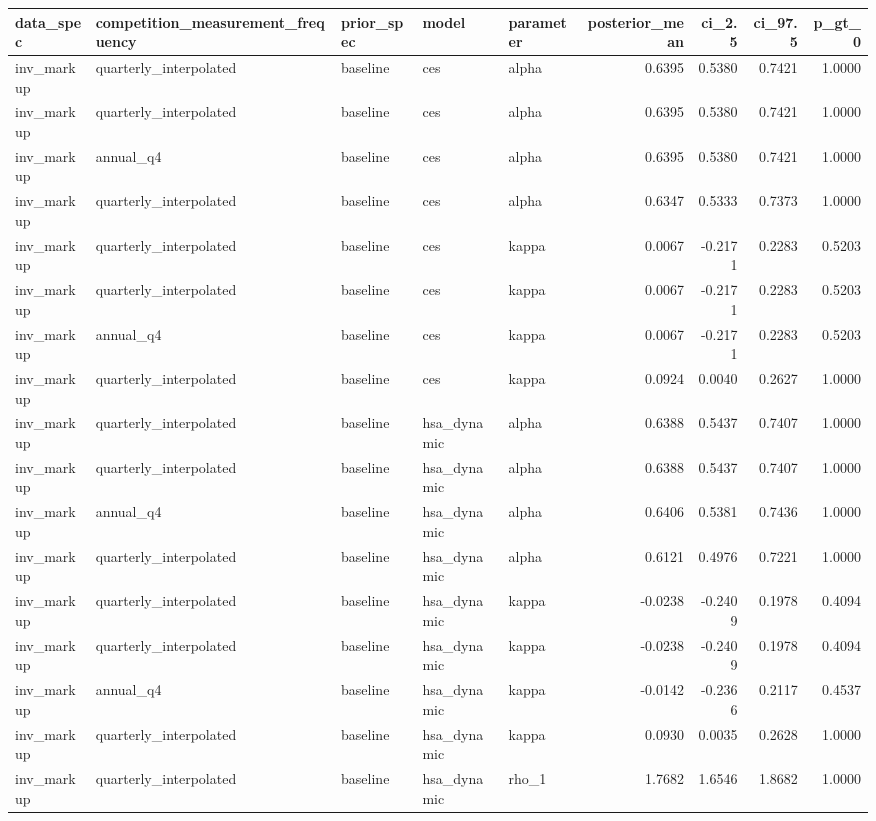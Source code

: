 \begin{tabular}{lllllrrrr}
\toprule
data\_spec & competition\_measurement\_frequency & prior\_spec & model & parameter & posterior\_mean & ci\_2.5 & ci\_97.5 & p\_gt\_0 \\
\midrule
inv\_markup & quarterly\_interpolated & baseline & ces & alpha & 0.6395 & 0.5380 & 0.7421 & 1.0000 \\
inv\_markup & quarterly\_interpolated & baseline & ces & alpha & 0.6395 & 0.5380 & 0.7421 & 1.0000 \\
inv\_markup & annual\_q4 & baseline & ces & alpha & 0.6395 & 0.5380 & 0.7421 & 1.0000 \\
inv\_markup & quarterly\_interpolated & baseline & ces & alpha & 0.6347 & 0.5333 & 0.7373 & 1.0000 \\
inv\_markup & quarterly\_interpolated & baseline & ces & kappa & 0.0067 & -0.2171 & 0.2283 & 0.5203 \\
inv\_markup & quarterly\_interpolated & baseline & ces & kappa & 0.0067 & -0.2171 & 0.2283 & 0.5203 \\
inv\_markup & annual\_q4 & baseline & ces & kappa & 0.0067 & -0.2171 & 0.2283 & 0.5203 \\
inv\_markup & quarterly\_interpolated & baseline & ces & kappa & 0.0924 & 0.0040 & 0.2627 & 1.0000 \\
inv\_markup & quarterly\_interpolated & baseline & hsa\_dynamic & alpha & 0.6388 & 0.5437 & 0.7407 & 1.0000 \\
inv\_markup & quarterly\_interpolated & baseline & hsa\_dynamic & alpha & 0.6388 & 0.5437 & 0.7407 & 1.0000 \\
inv\_markup & annual\_q4 & baseline & hsa\_dynamic & alpha & 0.6406 & 0.5381 & 0.7436 & 1.0000 \\
inv\_markup & quarterly\_interpolated & baseline & hsa\_dynamic & alpha & 0.6121 & 0.4976 & 0.7221 & 1.0000 \\
inv\_markup & quarterly\_interpolated & baseline & hsa\_dynamic & kappa & -0.0238 & -0.2409 & 0.1978 & 0.4094 \\
inv\_markup & quarterly\_interpolated & baseline & hsa\_dynamic & kappa & -0.0238 & -0.2409 & 0.1978 & 0.4094 \\
inv\_markup & annual\_q4 & baseline & hsa\_dynamic & kappa & -0.0142 & -0.2366 & 0.2117 & 0.4537 \\
inv\_markup & quarterly\_interpolated & baseline & hsa\_dynamic & kappa & 0.0930 & 0.0035 & 0.2628 & 1.0000 \\
inv\_markup & quarterly\_interpolated & baseline & hsa\_dynamic & rho\_1 & 1.7682 & 1.6546 & 1.8682 & 1.0000 \\

\end{tabular}

